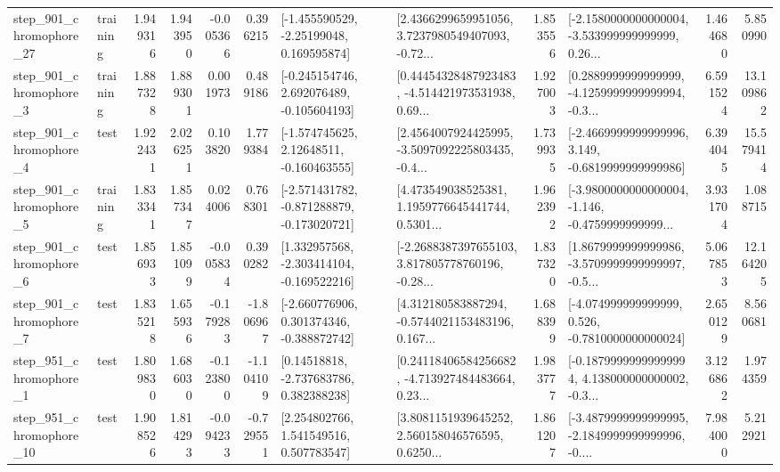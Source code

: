 \begin{tabular}{llrrrrllrlrr}
  step\_901\_chromophore\_27 &  training &      1.949316 &    1.943950 &     -0.005366 &  0.396215 &    [-1.455590529, -2.25199048, 0.169595874] &  [2.4366299659951056, 3.7237980549407093, -0.72... &       1.853556 &  [-2.1580000000000004, -3.533999999999999, 0.26... &            1.464680 &          5.850990 \\
   step\_901\_chromophore\_3 &  training &      1.887328 &    1.889301 &      0.001973 &  0.489186 &   [-0.245154746, 2.692076489, -0.105604193] &  [0.44454328487923483, -4.514421973531938, 0.69... &       1.927003 &  [0.2889999999999999, -4.1259999999999994, -0.3... &            6.591524 &         13.109862 \\
   step\_901\_chromophore\_4 &      test &      1.922431 &    2.026251 &      0.103820 &  1.779384 &    [-1.574745625, 2.12648511, -0.160463555] &  [2.4564007924425995, -3.5097092225803435, -0.4... &       1.739935 &  [-2.4669999999999996, 3.149, -0.6819999999999986] &            6.394045 &         15.579414 \\
   step\_901\_chromophore\_5 &  training &      1.833341 &    1.857347 &      0.024006 &  0.768301 &  [-2.571431782, -0.871288879, -0.173020721] &  [4.473549038525381, 1.1959776645441744, 0.5301... &       1.962392 &  [-3.9800000000000004, -1.146, -0.4759999999999... &            3.931704 &          1.088715 \\
   step\_901\_chromophore\_6 &      test &      1.856933 &    1.851099 &     -0.005834 &  0.390282 &   [1.332957568, -2.303414104, -0.169522216] &  [-2.2688387397655103, 3.817805778760196, -0.28... &       1.837320 &  [1.8679999999999986, -3.5709999999999997, -0.5... &            5.067853 &         12.164205 \\
   step\_901\_chromophore\_7 &      test &      1.835218 &    1.655936 &     -0.179283 & -1.806967 &   [-2.660776906, 0.301374346, -0.388872742] &  [4.312180583887294, -0.5744021153483196, 0.167... &       1.688399 &   [-4.074999999999999, 0.526, -0.7810000000000024] &            2.650129 &          8.560681 \\
   step\_951\_chromophore\_1 &      test &      1.809830 &    1.686030 &     -0.123800 & -1.104109 &     [0.14518818, -2.737683786, 0.382388238] &  [0.24118406584256682, -4.713927484483664, 0.23... &       1.983777 &  [-0.18799999999999994, 4.138000000000002, -0.3... &            3.126862 &          1.974359 \\
  step\_951\_chromophore\_10 &      test &      1.908526 &    1.814293 &     -0.094233 & -0.729551 &     [2.254802766, 1.541549516, 0.507783547] &  [3.8081151939645252, 2.560158046576595, 0.6250... &       1.861207 &  [-3.4879999999999995, -2.1849999999999996, -0.... &            7.984000 &          5.212921 \\

\end{tabular}
